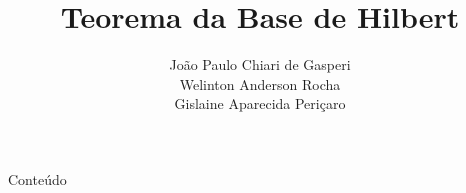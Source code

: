 \documentclass[aspectratio=169]{beamer}
\title{Teorema da Base de Hilbert}
\author{\Large
	João Paulo Chiari de Gasperi\\
	Welinton Anderson Rocha\\
	Gislaine Aparecida Periçaro\\
}
\date{}
\begin{document}
\begin{frame}[plain]
	\titlepage
\end{frame}

\begin{frame}{Conteúdo}
	\tableofcontents
\end{frame}





\end{document}
